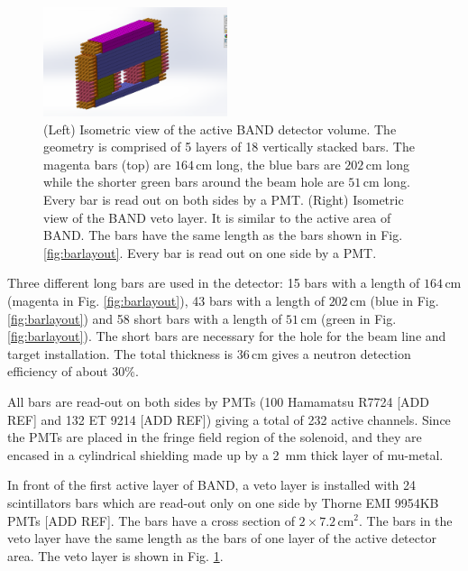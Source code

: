 \documentclass[review]{elsarticle}
\begin{document}
\begin{itemize}
\begin{figure}[htb]
\centering
\includegraphics[width=0.48\textwidth]{Band01.png}
 \caption {(Left) Isometric view of the active BAND detector volume. The geometry is comprised of 5 layers of 18 vertically stacked bars. The magenta bars (top) are $164\,\mathrm{cm}$ long, the blue bars are $202\,\mathrm{cm}$ long while the shorter green bars around the beam hole are $51\,\mathrm{cm}$ long. Every bar is read out on both sides by a PMT. (Right) Isometric view of the BAND veto layer. It is similar to the active area of BAND. The bars have the same length as the bars shown in Fig. \ref{fig:barlayout}. Every bar is read out on one side by a PMT.}
  \label{fig:vetolayout}
\end{figure}
Three different long bars are used in the detector: 15 bars with a length of $164\,\mathrm{cm}$ (magenta in Fig. \ref{fig:barlayout}), 43 bars with a length of $202\,\mathrm{cm}$ (blue in Fig. \ref{fig:barlayout}) and 58 short bars with a length of $51\,\mathrm{cm}$ (green in Fig. \ref{fig:barlayout}). The short bars are necessary for the hole for the beam line and target installation. The total thickness is $36\,\mathrm{cm}$ gives a neutron detection efficiency of about 30\%.

All bars are read-out on both sides by PMTs (100 Hamamatsu R7724  [ADD REF] and 132 ET 9214  [ADD REF]) giving a total of 232 active channels. Since the PMTs are placed in the fringe field region of the solenoid, and they are encased in a cylindrical shielding made up by a \SI{2}{\milli\metre} thick layer of mu-metal.

In front of the first active layer of BAND, a veto layer is installed with 24 scintillators bars which are read-out only on one side by Thorne EMI 9954KB PMTs [ADD REF]. The bars have a cross section of $2 \times 7.2\,\mathrm{cm}^{2}$. The bars in the veto layer have the same length as the bars of one layer of the active detector area. The veto layer is shown in Fig. \ref{fig:vetolayout}.


\end{itemize}
\end{document}
